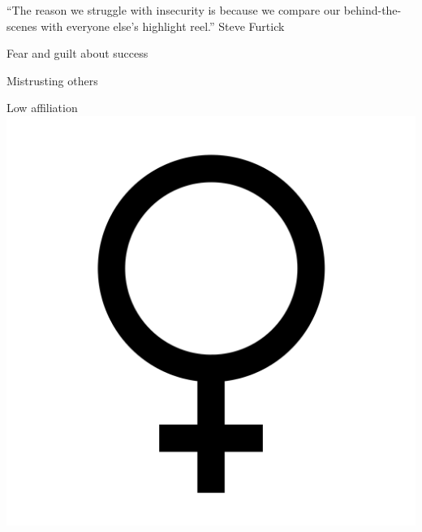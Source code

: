 \documentclass[aspectratio=169]{beamer}
\begin{document}
\begin{frame}
  \begin{center}
    \Huge ``The reason we struggle with insecurity is because we compare our behind-the-scenes with everyone else’s highlight reel.'' Steve Furtick
  \end{center}
\end{frame}

\begin{frame}
  \begin{center}
    \Huge Fear and guilt about success
    \\ \small \cite{sakulku11}
  \end{center}
\end{frame}

\begin{frame}
  \begin{center}
    \Huge Mistrusting others
    \\ \small \cite{langford93}
  \end{center}
\end{frame}

\begin{frame}
  \begin{center}
    \Huge Low affiliation \\
    \includegraphics[scale=.025]{./assets/women.png}
    \\ \small \cite{langford93}
  \end{center}
\end{frame}
\end{document}
